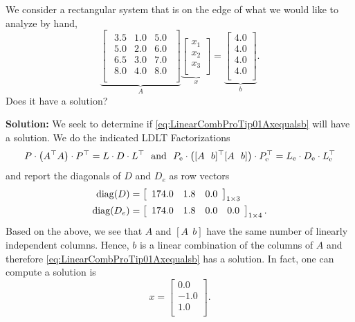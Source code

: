 \begin{example} 
\label{ex:LinearCombProTip01} We consider a rectangular system that is on the edge  of what we would like to analyze by hand,
\begin{equation}
    \label{eq:LinearCombProTip01Axequalsb}
\underbrace{ \left[
\begin{array}{rrr}
\begin{array}{ccc}
3.5 & 1.0 & 5.0 \\
5.0 & 2.0 & 6.0 \\
6.5 & 3.0 & 7.0 \\
8.0 & 4.0 & 8.0 \\
\end{array}
\end{array}
\right]}_{A} \underbrace{ \left[
\begin{array}{r}
x_1 \\
x_2 \\
x_3\\
\end{array}
\right]}_{x} = 
\underbrace{ \left[
\begin{array}{r}
4.0 \\
4.0 \\
4.0 \\
4.0 \\
\end{array}
\right]}_{b}.
\end{equation}
Does it have a solution? 
\end{example}

\textbf{Solution:} We seek to determine if \eqref{eq:LinearCombProTip01Axequalsb} will have a solution. We do the indicated LDLT Factorizations 
$$P \cdot \left(A^\top A \right) \cdot P^\top = L \cdot D \cdot L^\top~~\text{and}~~
 P_{\rm e} \cdot \left([A~~b]^\top [A~~b]  \right)\cdot  P_{\rm e}^\top = L_{\rm e}  \cdot  D_{\rm e} \cdot L_{\rm e}^\top  $$
and report the diagonals of $D$ and $D_e$ as row vectors
\begin{align}
    \label{eq:DiagOfU}
{\rm diag}(D)&= \left[
\begin{array}{ccc}
174.0 & 1.8 & 0.0 \\
\end{array}
\right]_{1 \times 3} \\
{\rm diag}(D_e)&= 
\left[
\begin{array}{cccc}
174.0 & 1.8 & 0.0 & 0.0  \\
\end{array}
\right]_{1 \times 4}.
  \label{eq:DiagOfUe}
\end{align}
Based on the above, we see that $A$ and $[A~~b]$ have the same number of linearly independent columns. Hence, $b$ is a linear combination of the columns of $A$ and therefore \eqref{eq:LinearCombProTip01Axequalsb} has a solution. In fact, one can compute a solution is 
\begin{equation}
\label{eq:OneSolutionOrUniqueSolution}
x=\left[
\begin{array}{r}
0.0 \\
-1.0 \\
1.0 \\
\end{array}
\right].
\end{equation}\\

